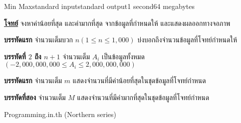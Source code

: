 \documentclass[11pt,a4paper]{article}
\begin{document}
\begin{problem}{Min Max}{standard input}{standard output}{1 second}{64 megabytes}

\underline{\textbf{โจทย์}} จงหาค่าน้อยที่สุด และค่ามากที่สุด จากข้อมูลที่กำหนดให้ และแสดงผลออกทางจอภาพ

\InputFile

\textbf{บรรทัดแรก} จำนวนเต็มบวก $n$$ (1 \leq n \leq 1,000)$ บ่งบอกถึงจำนวนข้อมูลที่โจทย์กำหนดให้

\textbf{บรรทัดที่ $2$ ถึง $n+1$} จำนวนเต็ม $A_i$ เป็นข้อมูลทั้งหมด $( -2,000,000,000 \leq A_i \leq 2,000,000,000)$

\OutputFile

\textbf{บรรทัดแรก} จำนวนเต็ม $m$ แสดงจำนวนที่มีค่าน้อยที่สุดในชุดข้อมูลที่โจทย์กำหนด

\textbf{บรรทัดที่สอง} จำนวนเต็ม $M$ แสดงจำนวนที่มีค่ามากที่สุดในชุดข้อมูลที่โจทย์กำหนด

\Examples

\begin{example}
%
\end{example}

\Source

Programming.in.th (Northern series)

\end{problem}
\end{document}
